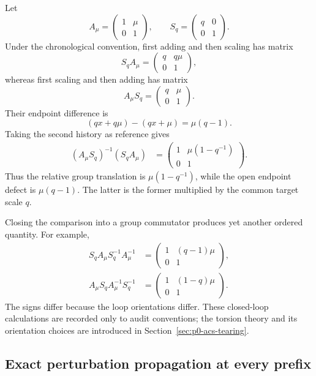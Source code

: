 Let
\[
  A_\mu=
  \begin{pmatrix}1&\mu\\0&1\end{pmatrix},
  \qquad
  S_q=
  \begin{pmatrix}q&0\\0&1\end{pmatrix}.
\]
Under the chronological convention, first adding and then scaling has matrix
\[
  S_qA_\mu
  =\begin{pmatrix}q&q\mu\\0&1\end{pmatrix},
\]
whereas first scaling and then adding has matrix
\[
  A_\mu S_q
  =\begin{pmatrix}q&\mu\\0&1\end{pmatrix}.
\]
Their endpoint difference is
\[
  (qx+q\mu)-(qx+\mu)=\mu(q-1).
\]
Taking the second history as reference gives
\begin{align*}
  (A_\mu S_q)^{-1}(S_qA_\mu)
  &=\begin{pmatrix}1&\mu(1-q^{-1})\\0&1\end{pmatrix}.
\end{align*}
Thus the relative group translation is $\mu(1-q^{-1})$, while the open
endpoint defect is $\mu(q-1)$.  The latter is the former multiplied by the
common target scale $q$.

Closing the comparison into a group commutator produces yet another ordered
quantity.  For example,
\begin{align*}
  S_qA_\mu S_q^{-1}A_\mu^{-1}
  &=\begin{pmatrix}1&(q-1)\mu\\0&1\end{pmatrix},\\
  A_\mu S_qA_\mu^{-1}S_q^{-1}
  &=\begin{pmatrix}1&(1-q)\mu\\0&1\end{pmatrix}.
\end{align*}
The signs differ because the loop orientations differ.  These closed-loop
calculations are recorded only to audit conventions; the torsion theory and
its orientation choices are introduced in Section~\ref{sec:p0-acs-tearing}.

\subsection{Exact perturbation propagation at every prefix}

